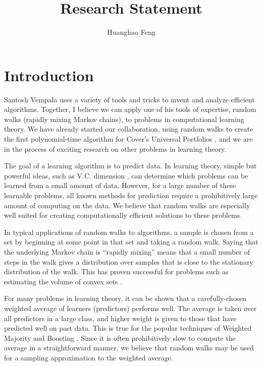


\title{Research Statement}
\author{Huanghao Feng}
\maketitle

\section{Introduction}
Santosh Vempala uses a variety of tools and tricks to invent and analyze
efficient algorithms.  Together, I believe we can apply one of his tools of
expertise, random walks (rapidly mixing Markov chains), to problems in
computational learning theory.  We have already started our collaboration,
using random walks to create the first polynomial-time algorithm for Cover's
Universal Portfolios \cite{KV}, and we are in the process of exciting research
on other problems in learning theory.

The goal of a learning algorithm is to predict data.  In learning theory,
simple but powerful ideas, such as V.C. dimension \cite{VC}, can determine
which problems can be learned from a small amount of data.  However, for a
large number of these learnable problems, all known methods for prediction
require a prohibitively large amount of computing on the data.  We believe
that random walks are especially well suited for creating computationally
efficient solutions to these problems.

In typical applications of random walks to algorithms, a sample is chosen from
a set by beginning at some point in that set and taking a random walk.  Saying
that the underlying Markov chain is ``rapidly mixing'' means that a small
number of steps in the walk gives a distribution over samples that is close to
the stationary distribution of the walk.  This has proven successful for
problems such as estimating the volume of convex sets \cite{KLS}.

For many problems in learning theory, it can be shown that a carefully-chosen
weighted average of learners (predictors) performs well.  The average is taken
over all predictors in a large class, and higher weight is given to those that
have predicted well on past data.  This is true for the popular techniques of
Weighted Majority \cite{LW} and Boosting \cite{Schapire}.  Since it is often
prohibitively slow to compute the average in a straightforward manner, we
believe that random walks may be used for a sampling approximation to the
weighted average.

